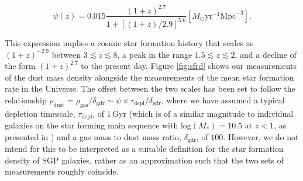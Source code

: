 \begin{equation}
    \psi(z) = 0.015\frac{(1+z)^{2.7}}{1+[(1+z)/2.9]^{5.6}} [M_{\odot}\textrm{yr}^{-1}\textrm{Mpc}^{-3}].
    \label{eq:madau_sfrd}
\end{equation}

This expression implies a cosmic star formation history that scales as $(1 + z)^{-2.9}$ between $3 \lesssim z \lesssim 8$, a peak in the range $1.5 \lesssim z \lesssim 2$, and a decline of the form $(1 + z)^{2.7}$ to the present day. Figure \ref{fig:sfrd} shows our measurements of the dust mass density alongside the measurements of the mean star formation rate in the Universe. The offset between the two scales has been set to follow the relationship $\rho_{\textrm{dust}} = \rho_{\textrm{gas}}/\delta_{\textrm{gdr}} \sim \psi \times\tau_{\textrm{depl}}/\delta_{\textrm{gdr}}$, where we have assumed a typical depletion timescale, $\tau_{\textrm{depl}}$, of $1\,$Gyr (which is of a similar magnitude to individual galaxies on the star forming main sequence with $\textrm{log}(M_*) = 10.5$ at $z < 1$, as presented in \citealt{Tacconi_2020}) and a gas mass to dust mass ratio, $\delta_{\textrm{gdr}}$, of $100$. However, we do not intend for this to be interpreted as a suitable definition for the star formation density of SGP galaxies, rather as an approximation such that the two sets of measurements roughly coincide. 

